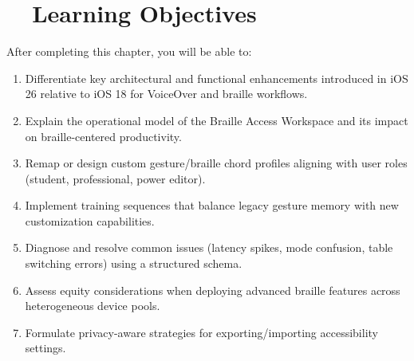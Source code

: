 \section{~~Learning Objectives}
\label{sec:sr30-learning-objectives}
After completing this chapter, you will be able to:
\begin{enumerate}
	\item Differentiate key architectural and functional enhancements introduced in iOS 26 relative to iOS 18 for VoiceOver and braille workflows.
	\item Explain the operational model of the Braille Access Workspace and its impact on braille-centered productivity.
	\item Remap or design custom gesture/braille chord profiles aligning with user roles (student, professional, power editor).
	\item Implement training sequences that balance legacy gesture memory with new customization capabilities.
	\item Diagnose and resolve common issues (latency spikes, mode confusion, table switching errors) using a structured schema.
	\item Assess equity considerations when deploying advanced braille features across heterogeneous device pools.
	\item Formulate privacy-aware strategies for exporting/importing accessibility settings.
\end{enumerate}

